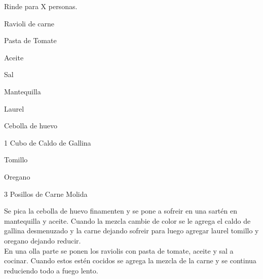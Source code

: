 
Rinde para X personas.

\begin{ingredientes}
\item Ravioli de carne
\item Pasta de Tomate
\item Aceite
\item Sal
\item Mantequilla
\item Laurel
\item Cebolla de huevo
\item 1 Cubo de Caldo de Gallina
\item Tomillo
\item Oregano
\item 3 Posillos de Carne Molida
\end{ingredientes}
\preparacion
Se pica la cebolla de huevo finamenten y se pone a sofreir en una sartén en mantequilla y aceite. Cuando la mezcla cambie de color se le agrega el caldo de gallina desmenuzado y la carne dejando sofreir para luego agregar laurel tomillo y oregano dejando reducir.\\

En una olla parte se ponen los raviolis con pasta de tomate, aceite y sal a cocinar. Cuando estos estén cocidos se agrega la mezcla de la carne y se continua reduciendo todo a fuego lento.